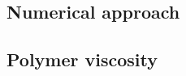 \documentclass[12pt, letterpaper]{article}
\begin{document}
%
%
%



\subsection{Numerical approach}


\subsection{Polymer viscosity}
\end{document}
